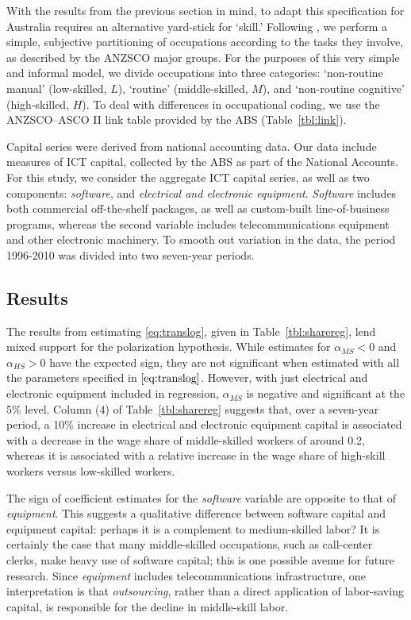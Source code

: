 With the results from the previous section in mind, to adapt this specification for Australia requires an alternative yard-stick for `skill.' Following \citet{Levy2003}, we perform a simple, subjective partitioning of occupations according to the tasks they involve, as described by the ANZSCO major groups. For the purposes of this very simple and informal model, we divide occupations into three categories: `non-routine manual' (low-skilled, $L$), `routine' (middle-skilled, $M$), and `non-routine cognitive' (high-skilled, $H$). To deal with differences in occupational coding, we use the ANZSCO--ASCO II link table provided by the ABS (Table~\ref{tbl:link}).

Capital series were derived from national accounting data. Our data include measures of ICT capital, collected by the ABS as part of the National Accounts. For this study, we consider the aggregate ICT capital series, as well as two components: {\em software}, and {\em electrical and electronic equipment}. {\em Software} includes both commercial off-the-shelf packages, as well as custom-built line-of-business programs, whereas the second variable includes telecommunications equipment and other electronic machinery. To smooth out variation in the data, the  period 1996-2010 was divided into two seven-year periods.

\subsection{Results}

The results from estimating \eqref{eq:translog}, given in Table~\ref{tbl:sharereg}, lend mixed support for the polarization hypothesis. While estimates for $\alpha_{MS}<0$ and $\alpha_{HS}>0$ have the expected sign, they are not significant when estimated with all the parameters specified in $\eqref{eq:translog}$. However, with just electrical and electronic equipment included in regression, $\alpha_{MS}$ is negative and significant at the 5\% level. Column (4) of Table~\ref{tbl:sharereg} suggests that, over a seven-year period, a 10\% increase in electrical and electronic equipment capital is associated with a decrease in the wage share of middle-skilled workers of around 0.2, whereas it is associated with a relative increase in the wage share of high-skill workers versus low-skilled workers.

The sign of coefficient estimates for the {\em software} variable are opposite to that of {\em equipment}. This suggests a qualitative difference between software capital and equipment capital: perhaps it is a complement to medium-skilled labor? It is certainly the case that many middle-skilled occupations, such as call-center clerks, make heavy use of software capital; this is one possible avenue for future research. Since {\em equipment} includes telecommunications infrastructure, one interpretation is that {\em outsourcing}, rather than a direct application of labor-saving capital, is responsible for the decline in middle-skill labor.

